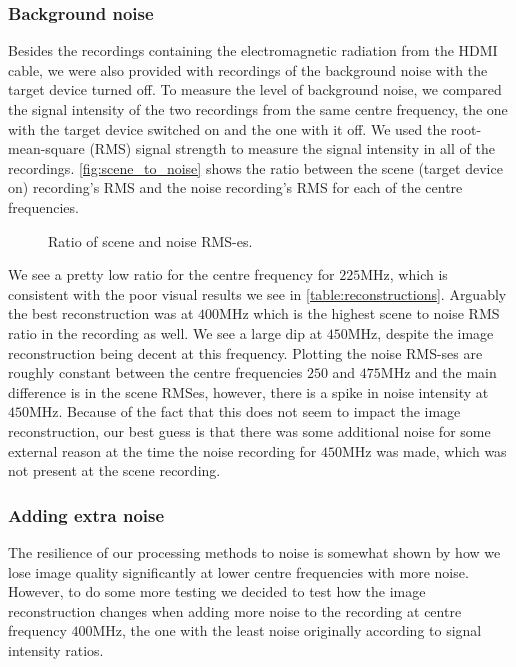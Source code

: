 \documentclass{article}
\begin{document}
\subsubsection{Background noise}

Besides the recordings containing the electromagnetic radiation from the HDMI cable, we were also provided with recordings of the background noise with the target device turned off. To measure the level of background noise, we compared the signal intensity of the two recordings from the same centre frequency, the one with the target device switched on and the one with it off. We used the root-mean-square (RMS) signal strength to measure the signal intensity in all of the recordings. \autoref{fig:scene_to_noise} shows the ratio between the scene (target device on) recording's RMS and the noise recording's RMS for each of the centre frequencies.

\begin{figure}[hbt]
    \centering
    
    \caption{Ratio of scene and noise RMS-es.}
    \label{fig:scene_to_noise}
\end{figure}

We see a pretty low ratio for the centre frequency for $225$MHz, which is consistent with the poor visual results we see in \autoref{table:reconstructions}. Arguably the best reconstruction was at $400$MHz which is the highest scene to noise RMS ratio in the recording as well. We see a large dip at $450$MHz, despite the image reconstruction being decent at this frequency. Plotting the noise RMS-ses are roughly constant between the centre frequencies $250$ and $475$MHz and the main difference is in the scene RMSes, however, there is a spike in noise intensity at $450$MHz. Because of the fact that this does not seem to impact the image reconstruction, our best guess is that there was some additional noise for some external reason at the time the noise recording for $450$MHz was made, which was not present at the scene recording.


\subsubsection{Adding extra noise}

The resilience of our processing methods to noise is somewhat shown by how we lose image quality significantly at lower centre frequencies with more noise. However, to do some more testing we decided to test how the image reconstruction changes when adding more noise to the recording at centre frequency $400$MHz, the one with the least noise originally according to signal intensity ratios.
\end{document}
